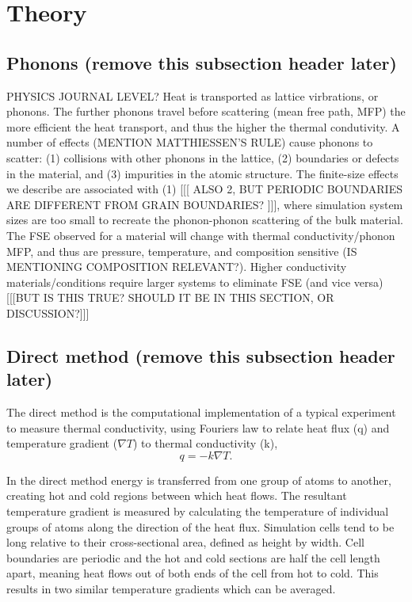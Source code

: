 \documentclass[%
preprint,                                  %
nofootinbib,
 amsmath,amssymb,
 aps,
]{revtex4-1}
\begin{document}
\section{\label{sec:theory}Theory}

\subsection{\label{sec:theory.phon}Phonons (remove this subsection header later)}

PHYSICS JOURNAL LEVEL? 
Heat is transported as lattice virbrations, or phonons. The further phonons travel before scattering (mean free path, MFP) the more efficient the heat transport, and thus the higher the thermal condutivity. A number of effects (MENTION MATTHIESSEN'S RULE) cause phonons to scatter: (1) collisions with other phonons in the lattice, (2) boundaries or defects in the material, and (3) impurities in the atomic structure. The finite-size effects we describe are associated with (1) [[[ ALSO 2, BUT PERIODIC BOUNDARIES ARE DIFFERENT FROM GRAIN BOUNDARIES? ]]], where simulation system sizes are too small to recreate the phonon-phonon scattering of the bulk material. The FSE observed for a material will change with thermal conductivity/phonon MFP, and thus are pressure, temperature, and composition sensitive (IS MENTIONING COMPOSITION RELEVANT?). Higher conductivity materials/conditions require larger systems to eliminate FSE (and vice versa) [[[BUT IS THIS TRUE? SHOULD IT BE IN THIS SECTION, OR DISCUSSION?]]]




\subsection{\label{sec:theory.direct}Direct method (remove this subsection header later)}

The direct method is the computational implementation of a typical experiment to measure thermal conductivity, using Fourier\textsc{}s law to relate heat flux (q) and temperature gradient ($\nabla{T}$) to thermal conductivity (k), 
\begin{equation}
q=-k \nabla{T} \label{fourier}.
\end{equation}

In the direct method energy is transferred from one group of atoms to another, creating hot and cold regions between which heat flows. The resultant temperature gradient is measured by calculating the temperature of individual groups of atoms along the direction of the heat flux. Simulation cells tend to be long relative to their cross-sectional area, defined as height by width. %
Cell boundaries are periodic and the hot and cold sections are half the cell length apart, meaning heat flows out of both ends of the cell from hot to cold. This results in two similar temperature gradients which can be averaged.
\end{document}
